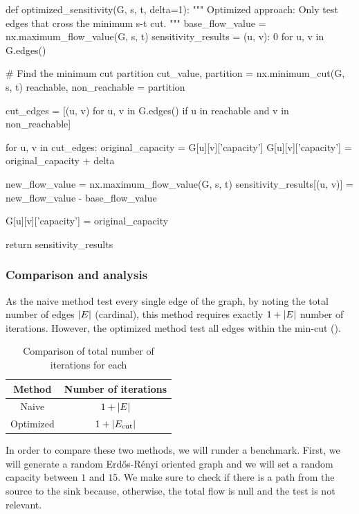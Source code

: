 \documentclass[12pt, openany]{article}
\begin{document}
\begin{python}[caption={Python code for the naive approach},  label={lst:1_optimized_method}]
def optimized_sensitivity(G, s, t, delta=1):
    """
    Optimized approach: Only test edges that cross the minimum s-t cut.
    """
    base_flow_value = nx.maximum_flow_value(G, s, t)
    sensitivity_results = { (u, v): 0 for u, v in G.edges() }
        
    # Find the minimum cut partition
    cut_value, partition = nx.minimum_cut(G, s, t)
    reachable, non_reachable = partition
    
    cut_edges = [(u, v) for u, v in G.edges() if u in reachable and v in non_reachable]
            
    for u, v in cut_edges:
        original_capacity = G[u][v]['capacity']
        G[u][v]['capacity'] = original_capacity + delta
        
        new_flow_value = nx.maximum_flow_value(G, s, t)
        sensitivity_results[(u, v)] = new_flow_value - base_flow_value
        
        G[u][v]['capacity'] = original_capacity
        
    return sensitivity_results
\end{python}

\subsubsection{Comparison and analysis}

As the naive method test every single edge of the graph, by noting the total number of edges $\abs{E}$ (cardinal), this method requires exactly $1+\abs{E}$ number of iterations. However, the optimized method test all edges within the min-cut ().

\begin{table}[H]
    \centering
    \begin{tabular}{c | c}
         Method & Number of iterations \\
         \hline
         Naive & $1 + \abs{E}$\\
         Optimized & $1 + \abs{E_{\text{cut}}}$
    \end{tabular}
    \caption{Comparison of total number of iterations for each}
    \label{tab:nb_iterations_methods_1}
\end{table}

In order to compare these two methods, we will runder a benchmark. First, we will generate a random Erdős-Rényi oriented graph and we will set a random capacity between $1$ and $15$. We make sure to check if there is a path from the source to the sink because, otherwise, the total flow is null and the test is not relevant.
\end{document}
